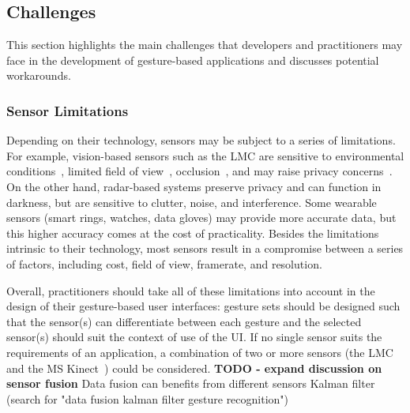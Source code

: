 

\subsection{Challenges} \label{sec:state_of_the_art:overview:challenges}
This section highlights the main challenges that developers and practitioners may face in the development of gesture-based applications and discusses potential workarounds.


\subsubsection{Sensor Limitations} \label{sec:state_of_the_art:overview:challenges:sensors-limitations}
Depending on their technology, sensors may be subject to a series of limitations. For example, vision-based sensors such as the LMC are sensitive to environmental conditions~\cite{Yeo:2017}, limited field of view~\cite{Hayashi:2021}, occlusion~\cite{Brandon:2014}, and may raise privacy concerns~\cite{Avrahami:2018}. On the other hand, radar-based systems preserve privacy and can function in darkness, but are sensitive to clutter, noise, and interference. Some wearable sensors (\eg smart rings, watches, data gloves) may provide more accurate data, but this higher accuracy comes at the cost of practicality. Besides the limitations intrinsic to their technology, most sensors result in a compromise between a series of factors, including cost, field of view, framerate, and resolution.

Overall, practitioners should take all of these limitations into account in the design of their gesture-based user interfaces: gesture sets should be designed such that the sensor(s) can differentiate between each gesture and the selected sensor(s) should suit the context of use of the UI. If no single sensor suits the requirements of an application, a combination of two or more sensors (\eg the LMC and the MS Kinect~\cite{Marin:2014}) could be considered. 
%
\textbf{TODO - expand discussion on sensor fusion} Data fusion can benefits from different sensors 
Kalman filter (search for "data fusion kalman filter gesture recognition")


